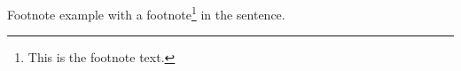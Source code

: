 \documentclass{article}
\begin{document}
Footnote example with a footnote\footnote{This is the footnote text.} in the sentence.
\end{document}

